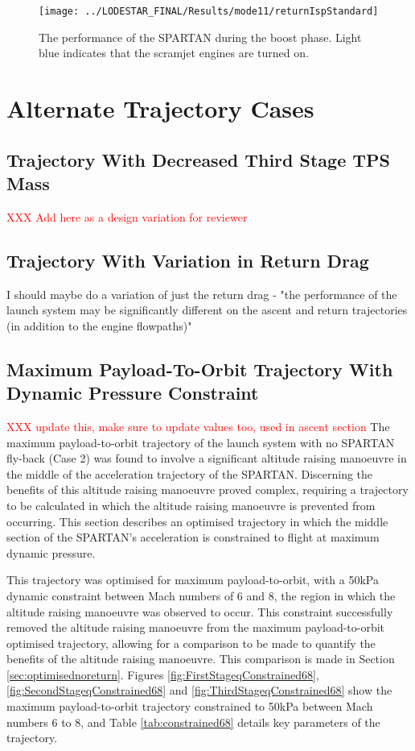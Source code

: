 \begin{figure}[ht]
	\centering
	\texttt{[image: ../LODESTAR\_FINAL/Results/mode11/returnIspStandard]}
	\caption{The performance of the SPARTAN during the boost phase. Light blue indicates that the scramjet engines are turned on.}
	\label{fig:returnIspStandard}
\end{figure}


		\chapter{Alternate Trajectory Cases}
		\section{Trajectory With Decreased Third Stage TPS Mass}
		\textcolor{red}{XXX Add here as a design variation for reviewer}
		
		\section{Trajectory With Variation in Return Drag}
		I should maybe do a variation of just the return drag - "the performance of the launch system may be significantly different on the ascent and return trajectories (in addition to the engine flowpaths)"
		
		\section{Maximum Payload-To-Orbit Trajectory With Dynamic Pressure Constraint}\label{sec:Appendix_qconst}
		\textcolor{red}{XXX update this, make sure to update values too, used in ascent section}
		The maximum payload-to-orbit trajectory of the launch system with no SPARTAN fly-back (Case 2) was found to involve a significant altitude raising manoeuvre in the middle of the acceleration trajectory of the SPARTAN. Discerning the benefits of this altitude raising manoeuvre proved complex, requiring a trajectory to be calculated in which the altitude raising manoeuvre is prevented from occurring. This section describes an optimised trajectory in which the middle section of the SPARTAN's acceleration is constrained to flight at maximum dynamic pressure. 
		
		 This trajectory was optimised for maximum payload-to-orbit, with a 50kPa dynamic constraint between Mach numbers of 6 and 8, the region in which the altitude raising manoeuvre was observed to occur. This constraint successfully removed the altitude raising manoeuvre from the maximum payload-to-orbit optimised trajectory, allowing for a comparison to be made to quantify the benefits of the altitude raising manoeuvre. This comparison is made in Section \ref{sec:optimisednoreturn}. Figures \ref{fig:FirstStageqConstrained68},  \ref{fig:SecondStageqConstrained68} and \ref{fig:ThirdStageqConstrained68} show the maximum payload-to-orbit trajectory constrained to 50kPa between Mach numbers 6 to 8, and Table \ref{tab:constrained68} details key parameters of the trajectory. 
		
